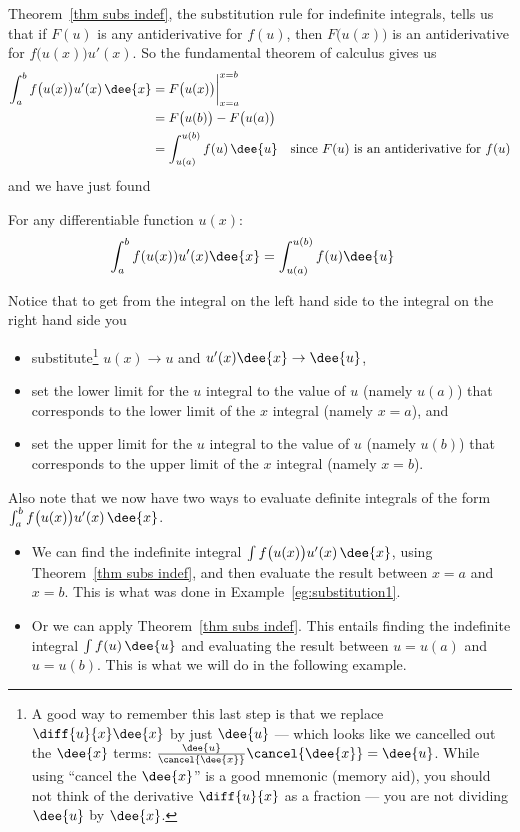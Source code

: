 Theorem~\ref{thm subs indef}, the substitution rule for indefinite integrals, tells us
that if $F(u)$ is any antiderivative for $f(u)$, then $F\big(u(x)\big)$ is an
antiderivative for $f\big(u(x)\big) u'(x)$. So the fundamental theorem of calculus gives
us
\begin{align*}
  \int_a^b f\big(u(x)\big) u'(x)\,\dee{x}
  &= F\big(u(x)\big)\bigg|_{x=a}^{x=b} \\
  &= F\big(u(b)\big) - F\big(u(a)\big) \\
  &= \int_{u(a)}^{u(b)} f(u)\,\dee{u}
  & \text{since $F(u)$ is an antiderivative for $f(u)$}
\end{align*}
and we have just found
\begin{theorem}\label{thm subs
def}
 For any differentiable function $u(x)$:
\begin{align*}
  \int_a^b f(u(x)) u'(x) \dee{x} &= \int_{u(a)}^{u(b)} f(u)\dee{u}
\end{align*}
\end{theorem}
Notice that to get from the integral on the left hand side to the integral on the right
hand side you
\begin{itemize}
\item substitute\footnote{A good way to remember this last step is that we
replace $\diff{u}{x} \dee{x}$ by just $\dee{u}$ --- which looks
like we cancelled out the $\dee{x}$ terms:
$\frac{\dee{u}}{\cancel{\dee{x}}}\cancel{\dee{x}} = \dee{u}$. While using ``cancel the
$\dee{x}$'' is a good mnemonic (memory aid), you should not think of the derivative
$\diff{u}{x}$ as a fraction --- you are not dividing $\dee{u}$ by $\dee{x}$. }
$u(x)\rightarrow u$ and
$u'(x)\dee{x}\rightarrow \dee{u}$,
  \item set the lower limit for the $u$ integral to the value of
    $u$ (namely $u(a)$) that corresponds to the lower limit of the $x$
    integral (namely $x=a$), and
  \item set the upper limit for the $u$ integral to the value of
    $u$ (namely $u(b)$) that corresponds to the upper limit of the $x$
    integral (namely $x=b$).
\end{itemize}
Also note that we now have two ways to evaluate definite integrals of the form
$\int_a^b f\big(u(x)\big)u'(x)\,\dee{x}$.
\begin{itemize}
\item We can find the indefinite integral $\int f\big(u(x)\big) u'(x)\,\dee{x}$, using
Theorem~\ref{thm subs indef}, and then evaluate the result between $x=a$ and $x=b$. This
is what was done in Example~\ref{eg:substitution1}.
\item Or we can apply Theorem~\ref{thm subs indef}. This entails finding the
indefinite integral $\int f(u)\,\dee{u}$ and evaluating the result between $u=u(a)$ and
$u=u(b)$. This is what we will do in the following example.
\end{itemize}


